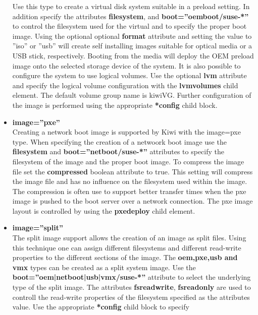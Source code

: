 \begin{itemize}
      Use this type to create a virtual disk system suitable in a preload
      setting. In addition specify the attributes \textbf{filesystem}, 
      and \textbf{boot=''oemboot/suse-*''} to control the filesystem used
      for the virtual and to specify the proper boot image. Using the optional
      optional \textbf{format} attribute and setting the value to ''iso'' or 
      ''usb'' will create self installing images suitable for optical media
      or a USB stick, respectively. Booting from the media will deploy
      the OEM preload image onto the selected storage device of the
      system. It is also possible to configure the system to use logical
      volumes. Use the optional \textbf{lvm} attribute and specify the
      logical volume configuration with the \textbf{lvmvolumes} child
      element. The default volume group name is kiwiVG. Further configuration
      of the image is performed using the appropriate \textbf{*config} child
      block.
\item \textbf{image=''pxe''}\\
      Creating a network boot image is supported by Kiwi with the image=pxe
      type. When specifying the creation of a netwoork boot image use the
      \textbf{filesystem} and \textbf{boot=''netboot/suse-*''} attributes 
      to specify the filesystem of the image and the proper boot image. To
      compress the image file set the \textbf{compressed} boolean attribute
      to true. This setting will compress the image file and has no influence
      on the filesystem used within the image. The compression is often use to
      support better transfer times when the pxe image is pushed to the 
      boot server over a network connection. The pxe image layout is
      controlled by using the \textbf{pxedeploy} child element.
\item \textbf{image=''split''}\\
      The split image support allows the creation of an image as split
      files. Using this technique one can assign different filesystems and
      different read-write properties to the different sections of the image.
      The \textbf{oem,pxe,usb and vmx} types can be created as a split system
      image. Use the \textbf{boot=''oem|netboot|usb|vmx/suse-*''} attribute
      to select the underlying type of the split image. The attributes
      \textbf{fsreadwrite}, \textbf{fsreadonly} are used to controll the
      read-write properties of the filesystem specified as the attributes
      value. Use the appropriate \textbf{*config} child block to specify

\end{itemize}
